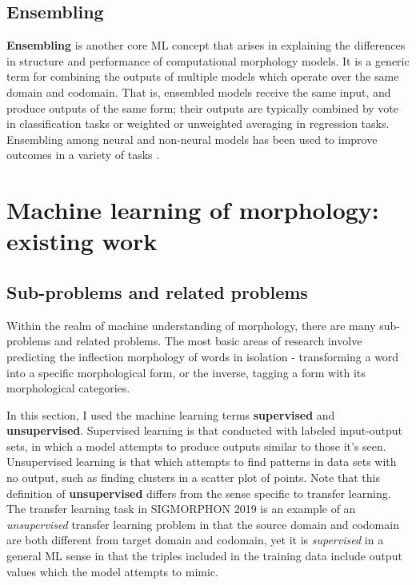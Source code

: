 \section{Ensembling}

\textbf{Ensembling} is another core ML concept that arises in explaining the differences in structure and performance of computational morphology models. It is a generic term for combining the outputs of multiple models which operate over the same domain and codomain. That is, ensembled models receive the same input, and produce outputs of the same form; their outputs are typically combined by vote in classification tasks or weighted or unweighted averaging in regression tasks. Ensembling among neural and non-neural models has been used to improve outcomes in a variety of tasks \parencite{Krogh1995}.

\chapter{Machine learning of morphology: existing work}

\section{Sub-problems and related problems}

Within the realm of machine understanding of morphology, there are many sub-problems and related problems. The most basic areas of research involve predicting the inflection morphology of words in isolation - transforming a word into a specific morphological form, or the inverse, tagging a form with its morphological categories. 

In this section, I used the machine learning terms \textbf{supervised} and \textbf{unsupervised}. Supervised learning is that conducted with labeled input-output sets, in which a model attempts to produce outputs similar to those it's seen. Unsupervised learning is that which attempts to find patterns in data sets with no output, such as finding clusters in a scatter plot of points. Note that this definition of \textbf{unsupervised} differs from the sense specific to transfer learning. The transfer learning task in SIGMORPHON 2019 is an example of an \textit{unsupervised} transfer learning problem in that the source domain and codomain are both different from target domain and codomain, yet it is \textit{supervised} in a general ML sense in that the triples included in the training data include output values which the model attempts to mimic.

